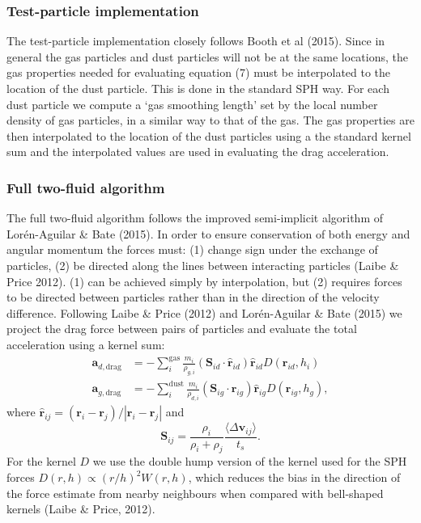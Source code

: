\documentclass[a4paper]{article}
\renewcommand{\vec}[1]{\ensuremath{\mathbf{#1}}}
\begin{document}
\subsubsection{Test-particle implementation}

The test-particle implementation closely follows Booth et al (2015). Since in general the gas particles and dust particles will not be at the same locations, the gas properties needed for evaluating equation (7) must be interpolated to the location of the dust particle. This is done in the standard SPH way. For each dust particle we compute a `gas smoothing length' set by the local number density of gas particles, in a similar way to that of the gas. The gas properties are then interpolated to the location of the dust particles using a the standard kernel sum and the interpolated values are used in evaluating the drag acceleration.

\subsubsection{Full two-fluid algorithm}

The full two-fluid algorithm follows the improved semi-implicit algorithm of Lor\'en-Aguilar \& Bate (2015). In order to ensure conservation of both energy and angular momentum the forces must: (1) change sign under the exchange of particles, (2) be directed along the lines between interacting particles (Laibe \& Price 2012). (1) can be achieved simply by interpolation, but (2) requires forces to be directed between particles rather than in the direction of the velocity difference. Following Laibe \& Price (2012) and Lor\'en-Aguilar \& Bate (2015) we project the drag force between pairs of particles and evaluate the total acceleration using a kernel sum:
\begin{align*}
 \vec{a}_{d,\mathrm{drag}} &= - \sum_i^\mathrm{gas} \frac{m_i}{\rho_{g,i}} ( \vec{S}_{id}  \cdot \vec{\hat r}_{id}) \vec{\hat r}_{id} D(\vec{r}_{id}, h_i) \\
 \vec{a}_{g,\mathrm{drag}} &= - \sum_i^\mathrm{dust} \frac{m_i}{\rho_{d,i}} ( \vec{S}_{ig} \cdot \vec{\hat r}_{ig}) \vec{\hat r}_{ig} D(\vec{r}_{ig}, h_g),
\end{align*}
where $\vec{\hat r}_{ij} = (\vec{r}_i - \vec{r}_j) / |\vec{r}_i - \vec{r}_j|$ and
\begin{equation}
 \vec{S}_{ij} = \frac{\rho_i}{\rho_i + \rho_j} \frac{\langle \Delta \vec{v}_{ij} \rangle}{t_s}.
\end{equation}
For the kernel $D$ we use the double hump version of the kernel used for the SPH forces $D(r,h) \propto (r/h)^2 W(r,h)$, which reduces the bias in the direction of the force estimate from nearby neighbours when compared with bell-shaped kernels (Laibe \& Price, 2012).
\end{document}
